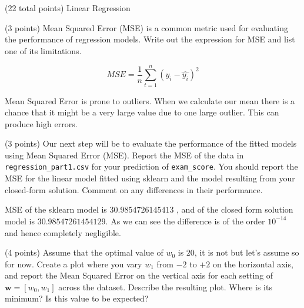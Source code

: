 \documentclass[12pt]{article}
\begin{document}
\begin{question}{(22 total points) Linear Regression}
\begin{subquestion}
\end{subquestion}



%
%
\begin{subquestion}{(3 points) Mean Squared Error (MSE) is a common metric used for evaluating the performance of regression models. 
Write out the expression for MSE and list one of its limitations. \\
}


\begin{answerbox}{10em}
$$MSE = \frac{1}{n}\sum_{t=1}^{n}(y_{i} - \hat{y_{i}})^2$$

Mean Squared Error is prone to outliers. When we calculate our mean there is a chance that it might be a very large value due to one large outlier. This can produce high errors.
\end{answerbox}



\end{subquestion}


 
%
%
\begin{subquestion}{(3 points) Our next step will be to evaluate the performance of the fitted models using Mean Squared Error (MSE). 
Report the MSE of the data in \texttt{regression\_part1.csv} for your prediction of \texttt{exam\_score}.
You should report the MSE for the linear model fitted using sklearn and the model resulting from your closed-form solution. 
Comment on any differences in their performance. 
}


\begin{answerbox}{10em}
MSE of the sklearn model is $30.9854726145413$ , and of the closed form solution model is $30.98547261454129$. As we can see the difference is of the order $10^{-14}$ and hence completely negligible.
\end{answerbox}



\end{subquestion}




%
%
\begin{subquestion}{(4 points) Assume that the optimal value of $w_0$ is $20$, it is not but let's assume so for now. 
Create a plot where you vary $w_1$ from $-2$ to $+2$ on the horizontal axis, and report the Mean Squared Error on the vertical axis for each setting of $\mathbf{w} = [w_0, w_1]$ across the dataset. 
Describe the resulting plot. Where is its minimum? Is this value to be expected?\\ 
}



\end{subquestion}
\end{question}
\end{document}
